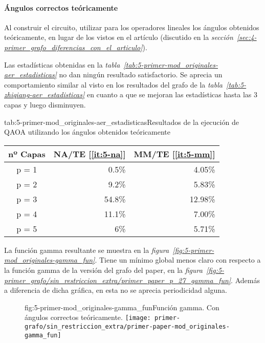 \paragraph{Ángulos correctos teóricamente}
Al construir el circuito, utilizar para los operadores lineales los ángulos obtenidos teóricamente, en lugar de los vistos en el artículo (discutido en la \textit{sección~\ref{sec:4-primer_grafo_diferencias_con_el_articulo}}).

Las estadísticas obtenidas en la \textit{tabla~\ref{tab:5-primer-mod_originales-aer_estadisticas}} no dan ningún resultado satisfactorio.
Se aprecia un comportamiento similar al visto en los resultados del grafo de la \textit{tabla~\ref{tab:5-zhiqiang-aer_estadisticas}} en cuanto a que se mejoran las estadísticas hasta las 3 capas y luego disminuyen.

\begin{table}[htbp]{tab:5-primer-mod_originales-aer_estadisticas}{Resultados de la ejecución de QAOA utilizando los ángulos obtenidos teóricamente}
  \centering
  \begin{tabular}{|c|r|r|}
    \hline
    \textbf{nº Capas} & \textbf{NA/TE} [\ref{it:5-na}] & \textbf{MM/TE} [\ref{it:5-mm}] \\ \hline
    p = 1 &  0.5\% &  4.05\% \\ \hline
    p = 2 &  9.2\% &  5.83\% \\ \hline
    p = 3 & 54.8\% & 12.98\% \\ \hline
    p = 4 & 11.1\% &  7.00\% \\ \hline
    p = 5 &    6\% &  5.71\% \\ \hline
  \end{tabular}
\end{table}

La función gamma resultante se muestra en la \textit{figura~\ref{fig:5-primer-mod_originales-gamma_fun}}.
Tiene un mínimo global menos claro con respecto a la función gamma de la versión del grafo del paper, en la \textit{figura~\ref{fig:5-primer_grafo/sin_restriccion_extra/primer_paper_p_27_gamma_fun}}.
Además a diferencia de dicha gráfica, en esta no se aprecia periodicidad alguna.

\begin{figure}[htbp]{fig:5-primer-mod_originales-gamma_fun}{Función gamma. Con ángulos correctos teóricamente.}
  \centering
  \texttt{[image: primer-grafo/sin\_restriccion\_extra/primer-paper-mod\_originales-gamma\_fun]}
\end{figure}

